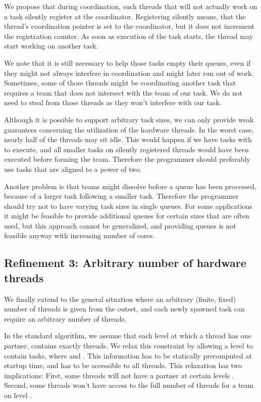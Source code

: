 \documentclass[preprint]{sigplanconf}
\begin{document}
We propose that during coordination, such threads that will not
actually work on a task  silently register at the
coordinator. Registering silently means, that the thread's
coordination pointer is set to the coordinator, but it does not
increment the registration counter. As soon as execution of the task
starts, the thread may start working on another task.

We note that it is still necessary to help those tasks empty their
queues, even if they might not always interfere in coordination and
might later run out of work. Sometimes, some of those threads
might be coordinating another task that requires a team that does not
intersect with the team of our task. We do not need to steal from those
threads as they won't interfere with our task.

Although it is possible to support arbitrary task sizes, we can only
provide weak guarantees concerning the utilization of the hardware
threads. In the worst case, nearly half of the threads may sit
idle. This would happen if we have tasks with  to execute,
and all smaller tasks on silently registered threads would have been
executed before forming the team. Therefore the programmer should
preferably use tasks that are aligned to a power of two.

Another problem is that teams might dissolve before a queue has been
processed, because of a larger task following a smaller
task. Therefore the programmer should try not to have varying task
sizes in single queues. For some applications it might be feasible to
provide additional queues for certain sizes that are often used, but
this approach cannot be generalized, and providing  queues is not
feasible anyway with increasing number of cores.

\subsection{Refinement 3: Arbitrary number of hardware threads}

We finally extend to the general situation where an arbitrary (finite,
fixed) number of threads is given from the outset, and
each newly spawned task can require an arbitrary number of threads.

In the standard algorithm, we assume that each level  at which a
thread has one partner, contains exactly  threads. We relax
this constraint by allowing a level to contain  tasks, where
 and . This
information has to be statically precomputed at startup time, and has to
be accessible to all threads. This relaxation has two implications:
First, some threads will not have a partner at certain levels
. Second, some threads won't have access to the full number of
threads for a team  on level .
\end{document}
